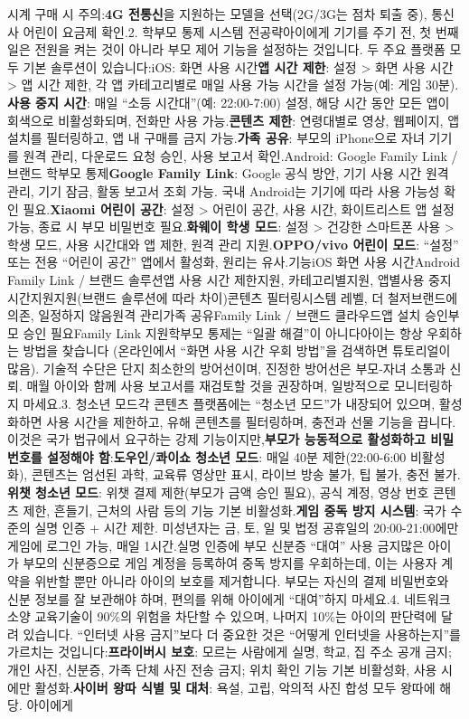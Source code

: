 시계 구매 시 주의:\textbf{4G 전통신}을 지원하는 모델을 선택(2G/3G는 점차 퇴출 중), 통신사 어린이 요금제 확인.2. 학부모 통제 시스템 전공략아이에게 기기를 주기 전, 첫 번째 일은 전원을 켜는 것이 아니라 부모 제어 기능을 설정하는 것입니다. 두 주요 플랫폼 모두 기본 솔루션이 있습니다:iOS: 화면 사용 시간\textbf{앱 시간 제한}: 설정 > 화면 사용 시간 > 앱 시간 제한, 각 앱 카테고리별로 매일 사용 가능 시간을 설정 가능(예: 게임 30분).\textbf{사용 중지 시간}: 매일 “소등 시간대”(예: 22:00-7:00) 설정, 해당 시간 동안 모든 앱이 회색으로 비활성화되며, 전화만 사용 가능.\textbf{콘텐츠 제한}: 연령대별로 영상, 웹페이지, 앱 설치를 필터링하고, 앱 내 구매를 금지 가능.\textbf{가족 공유}: 부모의 iPhone으로 자녀 기기를 원격 관리, 다운로드 요청 승인, 사용 보고서 확인.Android: Google Family Link / 브랜드 학부모 통제\textbf{Google Family Link}: Google 공식 방안, 기기 사용 시간 원격 관리, 기기 잠금, 활동 보고서 조회 가능. 국내 Android는 기기에 따라 사용 가능성 확인 필요.\textbf{Xiaomi 어린이 공간}: 설정 > 어린이 공간, 사용 시간, 화이트리스트 앱 설정 가능, 종료 시 부모 비밀번호 필요.\textbf{화웨이 학생 모드}: 설정 > 건강한 스마트폰 사용 > 학생 모드, 사용 시간대와 앱 제한, 원격 관리 지원.\textbf{OPPO/vivo 어린이 모드}: “설정” 또는 전용 “어린이 공간” 앱에서 활성화, 원리는 유사.기능iOS 화면 사용 시간Android Family Link / 브랜드 솔루션앱 사용 시간 제한지원, 카테고리별지원, 앱별사용 중지 시간지원지원(브랜드 솔루션에 따라 차이)콘텐츠 필터링시스템 레벨, 더 철저브랜드에 의존, 일정하지 않음원격 관리가족 공유Family Link / 브랜드 클라우드앱 설치 승인부모 승인 필요Family Link 지원학부모 통제는 “일괄 해결”이 아니다아이는 항상 우회하는 방법을 찾습니다 (온라인에서 “화면 사용 시간 우회 방법”을 검색하면 튜토리얼이 많음). 기술적 수단은 단지 최소한의 방어선이며, 진정한 방어선은 부모-자녀 소통과 신뢰. 매월 아이와 함께 사용 보고서를 재검토할 것을 권장하며, 일방적으로 모니터링하지 마세요.3. 청소년 모드각 콘텐츠 플랫폼에는 “청소년 모드”가 내장되어 있으며, 활성화하면 사용 시간을 제한하고, 유해 콘텐츠를 필터링하며, 충전과 선물 기능을 끕니다. 이것은 국가 법규에서 요구하는 강제 기능이지만,\textbf{부모가 능동적으로 활성화하고 비밀번호를 설정해야 함}:\textbf{도우인/콰이쇼 청소년 모드}: 매일 40분 제한(22:00-6:00 비활성화), 콘텐츠는 엄선된 과학, 교육류 영상만 표시, 라이브 방송 불가, 팁 불가, 충전 불가.\textbf{위챗 청소년 모드}: 위챗 결제 제한(부모가 금액 승인 필요), 공식 계정, 영상 번호 콘텐츠 제한, 흔들기, 근처의 사람 등의 기능 기본 비활성화.\textbf{게임 중독 방지 시스템}: 국가 수준의 실명 인증 + 시간 제한. 미성년자는 금, 토, 일 및 법정 공휴일의 20:00-21:00에만 게임에 로그인 가능, 매일 1시간.실명 인증에 부모 신분증 “대여” 사용 금지많은 아이가 부모의 신분증으로 게임 계정을 등록하여 중독 방지를 우회하는데, 이는 사용자 계약을 위반할 뿐만 아니라 아이의 보호를 제거합니다. 부모는 자신의 결제 비밀번호와 신분 정보를 잘 보관해야 하며, 편의를 위해 아이에게 “대여”하지 마세요.4. 네트워크 소양 교육기술이 90\%의 위험을 차단할 수 있으며, 나머지 10\%는 아이의 판단력에 달려 있습니다. “인터넷 사용 금지”보다 더 중요한 것은 “어떻게 인터넷을 사용하는지”를 가르치는 것입니다:\textbf{프라이버시 보호}: 모르는 사람에게 실명, 학교, 집 주소 공개 금지; 개인 사진, 신분증, 가족 단체 사진 전송 금지; 위치 확인 기능 기본 비활성화, 사용 시에만 활성화.\textbf{사이버 왕따 식별 및 대처}: 욕설, 고립, 악의적 사진 합성 모두 왕따에 해당. 아이에게 